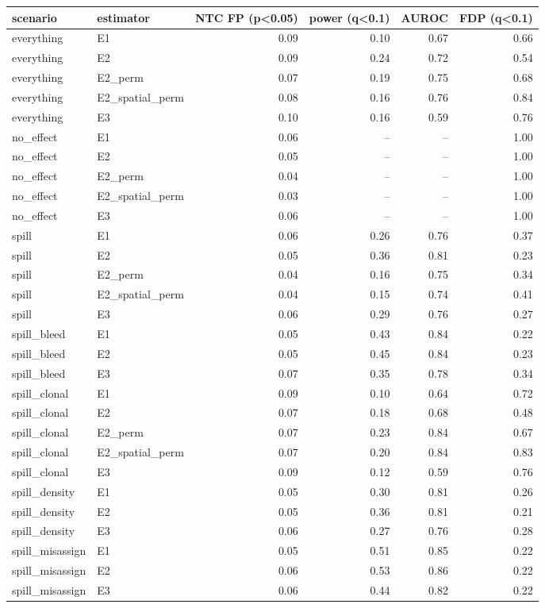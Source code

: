 \begin{tabular}{llrrrr}
\toprule
scenario & estimator & NTC FP (p<0.05) & power (q<0.1) & AUROC & FDP (q<0.1) \\
\midrule
everything & E1 & 0.09 & 0.10 & 0.67 & 0.66 \\
everything & E2 & 0.09 & 0.24 & 0.72 & 0.54 \\
everything & E2\_perm & 0.07 & 0.19 & 0.75 & 0.68 \\
everything & E2\_spatial\_perm & 0.08 & 0.16 & 0.76 & 0.84 \\
everything & E3 & 0.10 & 0.16 & 0.59 & 0.76 \\
no\_effect & E1 & 0.06 & -- & -- & 1.00 \\
no\_effect & E2 & 0.05 & -- & -- & 1.00 \\
no\_effect & E2\_perm & 0.04 & -- & -- & 1.00 \\
no\_effect & E2\_spatial\_perm & 0.03 & -- & -- & 1.00 \\
no\_effect & E3 & 0.06 & -- & -- & 1.00 \\
spill & E1 & 0.06 & 0.26 & 0.76 & 0.37 \\
spill & E2 & 0.05 & 0.36 & 0.81 & 0.23 \\
spill & E2\_perm & 0.04 & 0.16 & 0.75 & 0.34 \\
spill & E2\_spatial\_perm & 0.04 & 0.15 & 0.74 & 0.41 \\
spill & E3 & 0.06 & 0.29 & 0.76 & 0.27 \\
spill\_bleed & E1 & 0.05 & 0.43 & 0.84 & 0.22 \\
spill\_bleed & E2 & 0.05 & 0.45 & 0.84 & 0.23 \\
spill\_bleed & E3 & 0.07 & 0.35 & 0.78 & 0.34 \\
spill\_clonal & E1 & 0.09 & 0.10 & 0.64 & 0.72 \\
spill\_clonal & E2 & 0.07 & 0.18 & 0.68 & 0.48 \\
spill\_clonal & E2\_perm & 0.07 & 0.23 & 0.84 & 0.67 \\
spill\_clonal & E2\_spatial\_perm & 0.07 & 0.20 & 0.84 & 0.83 \\
spill\_clonal & E3 & 0.09 & 0.12 & 0.59 & 0.76 \\
spill\_density & E1 & 0.05 & 0.30 & 0.81 & 0.26 \\
spill\_density & E2 & 0.05 & 0.36 & 0.81 & 0.21 \\
spill\_density & E3 & 0.06 & 0.27 & 0.76 & 0.28 \\
spill\_misassign & E1 & 0.05 & 0.51 & 0.85 & 0.22 \\
spill\_misassign & E2 & 0.06 & 0.53 & 0.86 & 0.22 \\
spill\_misassign & E3 & 0.06 & 0.44 & 0.82 & 0.22 \\
\bottomrule
\end{tabular}
